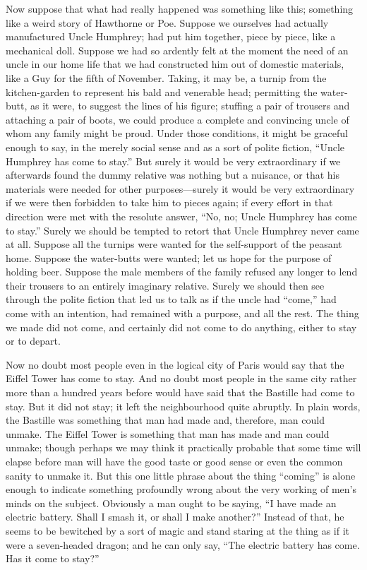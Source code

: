 \documentclass{book}
\begin{document}
Now suppose that what had really happened was something like this; something like a weird story of Hawthorne or Poe. Suppose we ourselves had actually manufactured Uncle Humphrey; had put him together, piece by piece, like a mechanical doll. Suppose we had so ardently felt at the moment the need of an uncle in our home life that we had constructed him out of domestic materials, like a Guy for the fifth of November. Taking, it may be, a turnip from the kitchen-garden to represent his bald and venerable head; permitting the water-butt, as it were, to suggest the lines of his figure; stuffing a pair of trousers and attaching a pair of boots, we could produce a complete and convincing uncle of whom any family might be proud. Under those conditions, it might be graceful enough to say, in the merely social sense and as a sort of polite fiction, “Uncle Humphrey has come to stay.” But surely it would be very extraordinary if we afterwards found the dummy relative was nothing but a nuisance, or that his materials were needed for other purposes—surely it would be very extraordinary if we were then forbidden to take him to pieces again; if every effort in that direction were met with the resolute answer, “No, no; Uncle Humphrey has come to stay.” Surely we should be tempted to retort that Uncle Humphrey never came at all. Suppose all the turnips were wanted for the self-support of the peasant home. Suppose the water-butts were wanted; let us hope for the purpose of holding beer. Suppose the male members of the family refused any longer to lend their trousers to an entirely imaginary relative. Surely we should then see through the polite fiction that led us to talk as if the uncle had “come,” had come with an intention, had remained with a purpose, and all the rest. The thing we made did not come, and certainly did not come to do anything, either to stay or to depart.

Now no doubt most people even in the logical city of Paris would say that the Eiffel Tower has come to stay. And no doubt most people in the same city rather more than a hundred years before would have said that the Bastille had come to stay. But it did not stay; it left the neighbourhood quite abruptly. In plain words, the Bastille was something that man had made and, therefore, man could unmake. The Eiffel Tower is something that man has made and man could unmake; though perhaps we may think it practically probable that some time will elapse before man will have the good taste or good sense or even the common sanity to unmake it. But this one little phrase about the thing “coming” is alone enough to indicate something profoundly wrong about the very working of men’s minds on the subject. Obviously a man ought to be saying, “I have made an electric battery. Shall I smash it, or shall I make another?” Instead of that, he seems to be bewitched by a sort of magic and stand staring at the thing as if it were a seven-headed dragon; and he can only say, “The electric battery has come. Has it come to stay?”
\end{document}
